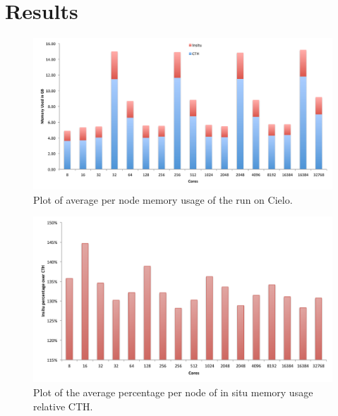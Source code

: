 \section{Results}
\label{sec:Results}


\begin{figure}[htb]
  \centering
  \includegraphics[width=\linewidth]{figures/MemoryUsagePerNode.pdf}
  \caption{Plot of average per node memory usage of the run on Cielo.}
  \label{fig:MemoryPerNode}
\end{figure}

\begin{figure}[htb]
  \centering
  \includegraphics[width=\linewidth]{figures/MemoryUsagePercent.pdf}
  \caption{Plot of the average percentage per node of in situ memory usage relative CTH.}
  \label{fig:MemoryTotal}
\end{figure}

